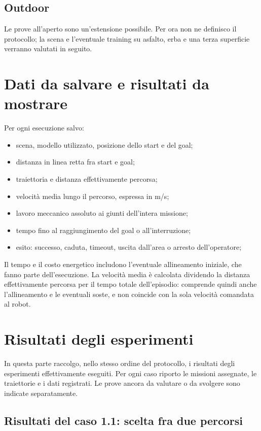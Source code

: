 \documentclass[11pt,a4paper]{article}
\begin{document}
\subsection{Outdoor}

Le prove all'aperto sono un'estensione possibile. Per ora non ne definisco il protocollo; la scena e l'eventuale training su asfalto, erba e una terza superficie verranno valutati in seguito.

\section{Dati da salvare e risultati da mostrare}

Per ogni esecuzione salvo:
\begin{itemize}
\item scena, modello utilizzato, posizione dello start e del goal;
\item distanza in linea retta fra start e goal;
\item traiettoria e distanza effettivamente percorsa;
\item velocità media lungo il percorso, espressa in m/s;
\item lavoro meccanico assoluto ai giunti dell'intera missione;
\item tempo fino al raggiungimento del goal o all'interruzione;
\item esito: successo, caduta, timeout, uscita dall'area o arresto dell'operatore;
\end{itemize}

Il tempo e il costo energetico includono l'eventuale allineamento iniziale, che fanno parte dell'esecuzione. La velocità media è calcolata dividendo la distanza effettivamente percorsa per il tempo totale dell'episodio: comprende quindi anche l'allineamento e le eventuali soste, e non coincide con la sola velocità comandata al robot.


\clearpage
\section{Risultati degli esperimenti}
\label{sec:risultati-esperimenti}

In questa parte raccolgo, nello stesso ordine del protocollo, i risultati degli esperimenti effettivamente eseguiti. Per ogni caso riporto le missioni assegnate, le traiettorie e i dati registrati. Le prove ancora da valutare o da svolgere sono indicate separatamente.

\subsection{Risultati del caso 1.1: scelta fra due percorsi}
\label{sec:risultati-caso-1-1}
\end{document}
